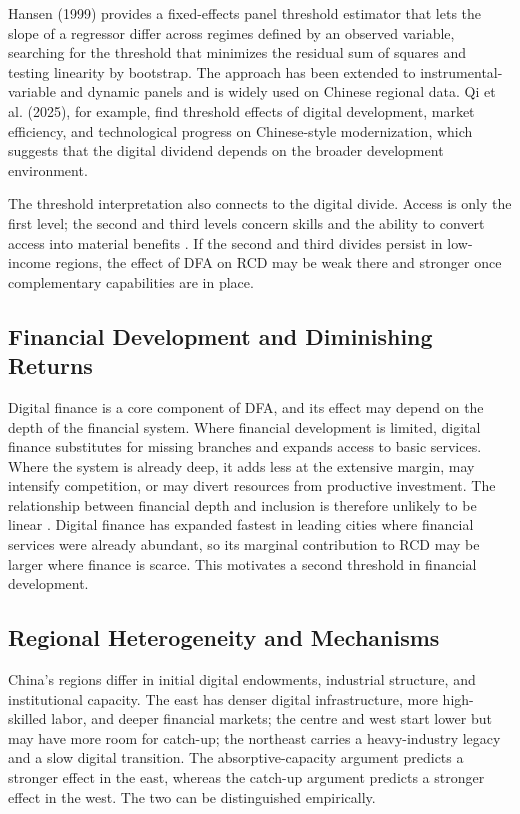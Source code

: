 Hansen (1999) provides a fixed-effects panel threshold estimator that lets the slope of a regressor differ across regimes defined by an observed variable, searching for the threshold that minimizes the residual sum of squares and testing linearity by bootstrap. The approach has been extended to instrumental-variable and dynamic panels \citep{caner2004,seo2016} and is widely used on Chinese regional data. Qi et al. (2025), for example, find threshold effects of digital development, market efficiency, and technological progress on Chinese-style modernization, which suggests that the digital dividend depends on the broader development environment.

The threshold interpretation also connects to the digital divide. Access is only the first level; the second and third levels concern skills and the ability to convert access into material benefits \citep{vandijk2005,norris2001,warschauer2003}. If the second and third divides persist in low-income regions, the effect of DFA on RCD may be weak there and stronger once complementary capabilities are in place.

\subsection{Financial Development and Diminishing Returns}

Digital finance is a core component of DFA, and its effect may depend on the depth of the financial system. Where financial development is limited, digital finance substitutes for missing branches and expands access to basic services. Where the system is already deep, it adds less at the extensive margin, may intensify competition, or may divert resources from productive investment. The relationship between financial depth and inclusion is therefore unlikely to be linear \citep{beck2007}. Digital finance has expanded fastest in leading cities where financial services were already abundant, so its marginal contribution to RCD may be larger where finance is scarce. This motivates a second threshold in financial development.

\subsection{Regional Heterogeneity and Mechanisms}

China's regions differ in initial digital endowments, industrial structure, and institutional capacity. The east has denser digital infrastructure, more high-skilled labor, and deeper financial markets; the centre and west start lower but may have more room for catch-up; the northeast carries a heavy-industry legacy and a slow digital transition. The absorptive-capacity argument predicts a stronger effect in the east, whereas the catch-up argument predicts a stronger effect in the west. The two can be distinguished empirically.

